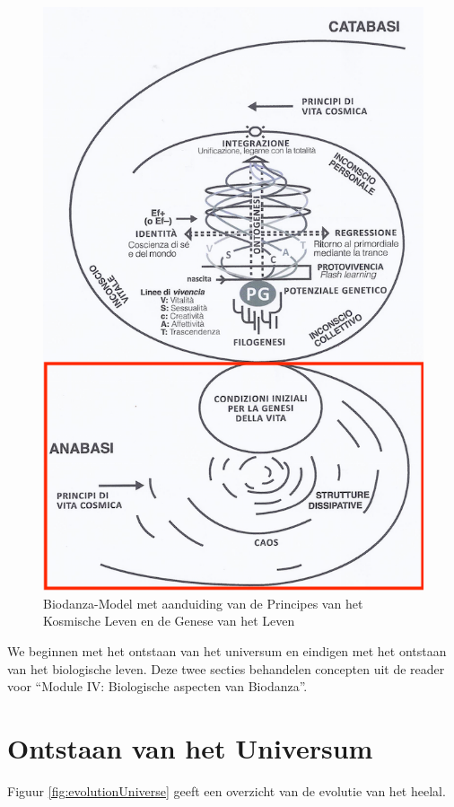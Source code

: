 \documentclass[
  11pt,
]{book}
\begin{document}
\begin{figure}

{\centering \includegraphics[width=0.5\linewidth]{./figs/biologischeAspectenBiodanzaDeelI} 

}

\caption{Biodanza-Model met aanduiding van de Principes van het Kosmische Leven en de Genese van het Leven}\label{fig:modelCosmic}
\end{figure}

We beginnen met het ontstaan van het universum en eindigen met het ontstaan van het biologische leven. Deze twee secties behandelen concepten uit de reader voor ``Module IV: Biologische aspecten van Biodanza''.

\hypertarget{ontstaan-van-het-universum}{%
\section{Ontstaan van het Universum}\label{ontstaan-van-het-universum}}

Figuur \ref{fig:evolutionUniverse} geeft een overzicht van de evolutie van het heelal.
\end{document}
